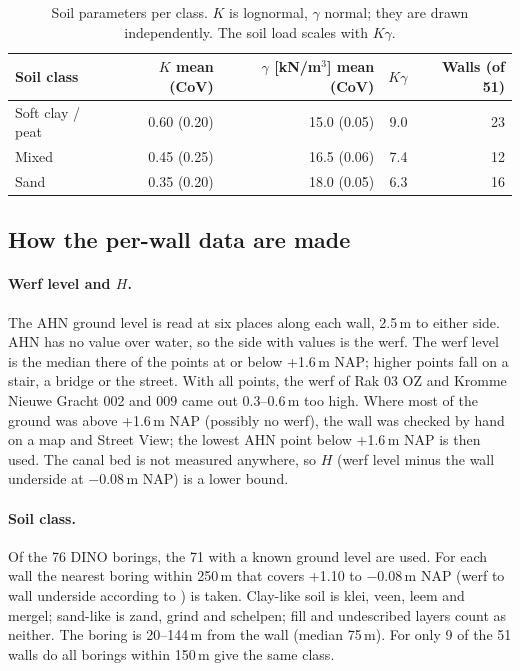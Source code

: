\begin{table}[htbp]
\centering
\small
\caption{Soil parameters per class. $K$ is lognormal, $\gamma$ normal; they
are drawn independently. The soil load scales with $K\gamma$.}
\label{tab:soil}
\begin{tabular}{@{}l r r r r@{}}
\toprule
Soil class & $K$ mean (CoV) & $\gamma$ [kN/m$^3$] mean (CoV) & $K\gamma$ & Walls (of 51) \\
\midrule
Soft clay / peat & 0.60 (0.20) & 15.0 (0.05) & 9.0 & 23 \\
Mixed            & 0.45 (0.25) & 16.5 (0.06) & 7.4 & 12 \\
Sand             & 0.35 (0.20) & 18.0 (0.05) & 6.3 & 16 \\
\bottomrule
\end{tabular}
\end{table}

\subsection{How the per-wall data are made}\label{app:data-method}

\paragraph{Werf level and $H$.} The AHN ground level is read at six places
along each wall, 2.5\,m to either side. AHN has no value over water, so the
side with values is the werf. The werf level is the median there of the points
at or below +1.6\,m NAP; higher points fall on a stair, a bridge or the street.
With all points, the werf of Rak 03 OZ and Kromme Nieuwe Gracht 002 and 009
came out 0.3--0.6\,m too high. Where most of the
ground was above +1.6\,m NAP (possibly no werf), the wall was checked by hand
on a map and Street View; the lowest AHN point below +1.6\,m NAP is then used.
The canal bed is not measured anywhere, so $H$ (werf level minus the wall
underside at $-0.08$\,m NAP) is a lower bound.

\paragraph{Soil class.} Of the 76 DINO borings, the 71 with a known ground
level are used. For each wall the nearest boring within 250\,m that covers
+1.10 to $-0.08$\,m NAP (werf to wall underside according to \textcite{erfgoed158}) is taken.
Clay-like soil is klei, veen, leem and mergel; sand-like is zand, grind and
schelpen; fill and undescribed layers count as neither. The boring is
20--144\,m from the wall (median 75\,m). For only 9 of the 51 walls do all
borings within 150\,m give the same class.

